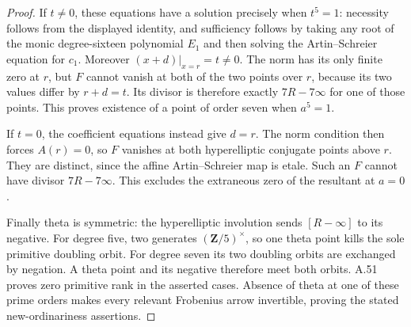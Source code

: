 \documentclass[11pt]{article}
\begin{document}
\begin{proof}
If $t\ne0$, these equations have a solution precisely
when $t^5=1$: necessity follows from the displayed
identity, and sufficiency follows by taking any root of
the monic degree-sixteen polynomial $E_1$ and then solving
the Artin--Schreier equation for $c_1$. Moreover
$(x+d)|_{x=r}=t\ne0$. The norm has its only finite zero
at $r$, but $F$ cannot vanish at both of the two points
over $r$, because its two values differ by $r+d=t$.
Its divisor is therefore exactly $7R-7\infty$ for one
of those points. This proves existence of a point of
order seven when $a^5=1$.

If $t=0$, the coefficient equations instead give $d=r$.
The norm condition then forces $A(r)=0$, so $F$ vanishes
at both hyperelliptic conjugate points above $r$. They
are distinct, since the affine Artin--Schreier map is
etale. Such an $F$ cannot have divisor $7R-7\infty$.
This excludes the extraneous zero of the resultant at $a=0$.

Finally theta is symmetric: the hyperelliptic involution
sends $[R-\infty]$ to its negative. For degree five,
two generates $(\mathbf Z/5)^\times$, so one theta point
kills the sole primitive doubling orbit. For degree
seven its two doubling orbits are exchanged by negation.
A theta point and its negative therefore meet both
orbits. A.51 proves zero primitive rank in the asserted
cases. Absence of theta at one of these prime orders
makes every relevant Frobenius arrow invertible, proving
the stated new-ordinariness assertions.
\end{proof}
\end{document}
